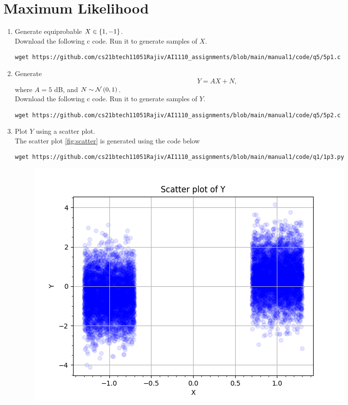 \documentclass[journal,12pt,twocolumn]{IEEEtran}
\renewcommand\thesection{\arabic{section}}
\begin{document}
\section{Maximum Likelihood}
\begin{enumerate}[label=\thesection.\arabic*
,ref=\thesection.\theenumi]
\item Generate equiprobable $X \in \left\{1,-1\right\}$.
\\
\solution Download the following c code. Run it to generate samples of $X$.
\begin{lstlisting}
wget https://github.com/cs21btech11051Rajiv/AI1110_assignments/blob/main/manual1/code/q5/5p1.c
\end{lstlisting}
\item Generate 
\begin{equation}
Y = AX+N,
\end{equation}
		where $A = 5$ dB,  and $N \sim \mathcal{N}\left(0,1\right)$.
\\
\solution Download the following c code. Run it to generate samples of $Y$.
\begin{lstlisting}
wget https://github.com/cs21btech11051Rajiv/AI1110_assignments/blob/main/manual1/code/q5/5p2.c
\end{lstlisting}
\item Plot $Y$ using a scatter plot.
\\
\solution
The scatter plot \ref{fig:scatter} is generated using the code below
\begin{lstlisting}
wget https://github.com/cs21btech11051Rajiv/AI1110_assignments/blob/main/manual1/code/q1/1p3.py
\end{lstlisting}
\begin{figure}[ht!]
    \centering
    \includegraphics[width=\columnwidth]{./figs/fig5.3b.png}

\end{figure}
\end{enumerate}
\end{document}
